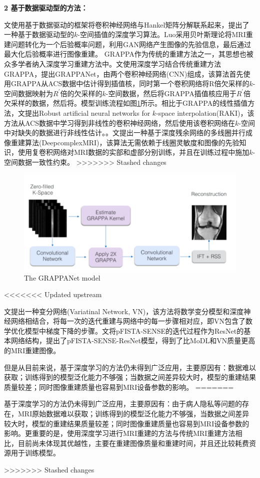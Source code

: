 \documentclass[UTF8]{article}
\begin{document}
\par \textbf{2 基于数据驱动型的方法：}
\par 文\cite{han2019k}使用基于数据驱动的框架将卷积神经网络与Hankel矩阵分解联系起来，提出了一种基于数据驱动型的$k$-空间插值的深度学习算法。Luo\cite{luo2020mri}采用贝叶斯理论将MRI重建问题转化为一个后验概率问题，利用GAN网络产生图像的先验信息，最后通过最大化后验概率进行图像重建。 GRAPPA作为传统的重建方法之一，其思想也被众多学者纳入深度学习重建方法中。文\cite{9157643}使用深度学习结合传统重建方法GRAPPA，提出GRAPPANet，由两个卷积神经网络(CNN)组成，该算法首先使用GRAPPA从ACS数据中估计得到插值核，同时第一个卷积网络将R倍欠采样的$k$-空间数据映射为$R^{'}$倍的欠采样的$k$-空间数据，然后将GRAPPA插值核应用于$R^{'}$倍欠采样的数据，然后将。模型训练流程如图\ref{GRAPPANet}所示。相比于GRAPPA的线性插值方法，文\cite{Mehmet2019Scan}提出Robust artificial neural networks for $k$-space interpolation(RAKI)，该方法从ACS数据中学习得到非线性的卷积神经网络，然后使用该卷积网络在$k$-空间中对缺失的数据进行非线性估计。。文\cite{WANG2020136}提出一种基于深度残余网络的多线圈并行成像重建算法(DeepcomplexMRI)，该算法无需依赖于线圈灵敏度和图像的先验知识，使用复卷积网络对MRI数据的实部和虚部分别训练，并且在训练过程中施加$k$-空间数据一致性约束。
>>>>>>> Stashed changes
\begin{figure}[ht]
	\centering
	\includegraphics[scale=1]{./image/GRAPPANet.png}
	\caption{The GRAPPANet model}
	\label{GRAPPANet}
\end{figure}
<<<<<<< Updated upstream
\par 文\cite{hammernik2018learning}提出一种变分网络(Variatinal Network, VN)，该方法将数学变分模型和深度神经网络相结合，将每一次的迭代重建与网络中的每一步骤相对应，即VN包含了数学优化模型中梯度下降的步骤。文\cite{LU2020106790}将pFISTA-SENSE的迭代过程作为ResNet的基本网络结构，提出了pFISTA-SENSE-ResNet模型，得到了比MoDL和VN质量更高的MRI重建图像。
\par 但是从目前来说，基于深度学习的方法仍未得到广泛应用，主要原因有：数据难以获取；训练得到的模型泛化能力不够强；当数据之间差异较大时，模型的重建结果质量较差；同时图像重建质量也容易到MRI设备参数的影响。
\cite{LI2021332}
=======
\par 基于深度学习的方法仍未得到广泛应用，主要原因有：由于病人隐私等问题的存在，MRI原始数据难以获取；训练得到的模型泛化能力不够强，当数据之间差异较大时，模型的重建结果质量较差；同时图像重建质量也容易到MRI设备参数的影响。更重要的是，使用深度学习进行MRI重建的方法与传统MRI重建方法相比，目前尚未体现其优越性，主要在重建图像质量和重建时间，并且还比较耗费资源用于训练模型。


>>>>>>> Stashed changes

\newpage


\end{document}
